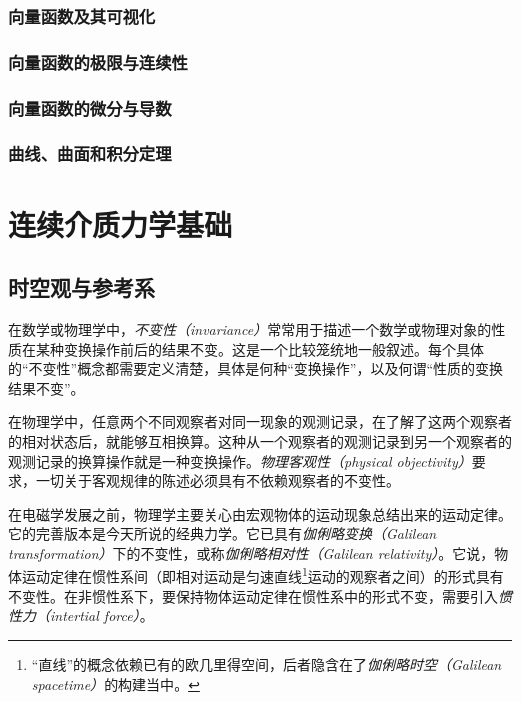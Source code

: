 \documentclass[zihao=-4,linespread=1.5,a4paper,heading=true,twoside]{ctexbook}
\theoremstyle{definition}
\theoremstyle{plain}
\begin{document}
\section{向量函数及其可视化}\label{sec:II.4.1}


\section{向量函数的极限与连续性}\label{sec:II.4.2}


\section{向量函数的微分与导数}\label{sec:II.4.3}


\section{曲线、曲面和积分定理}\label{sec:II.4.4}


\part{连续介质力学基础}\label{sec:III}
\chapter{时空观与参考系}\label{sec:III.5}
在数学或物理学中，\emph{不变性（invariance）}常常用于描述一个数学或物理对象的性质在某种变换操作前后的结果不变。这是一个比较笼统地一般叙述。每个具体的“不变性”概念都需要定义清楚，具体是何种“变换操作”，以及何谓“性质的变换结果不变”。

在物理学中，任意两个不同观察者对同一现象的观测记录，在了解了这两个观察者的相对状态后，就能够互相换算。这种从一个观察者的观测记录到另一个观察者的观测记录的换算操作就是一种变换操作。\emph{物理客观性（physical objectivity）}要求，一切关于客观规律的陈述必须具有不依赖观察者的不变性。

在电磁学发展之前，物理学主要关心由宏观物体的运动现象总结出来的运动定律。它的完善版本是今天所说的经典力学。它已具有\emph{伽俐略变换（Galilean transformation）}下的不变性，或称\emph{伽俐略相对性（Galilean relativity）}。它说，物体运动定律在惯性系间（即相对运动是匀速直线\footnote{“直线”的概念依赖已有的欧几里得空间，后者隐含在了\emph{伽俐略时空（Galilean spacetime）}的构建当中\cite{Weatherall2022}。}运动的观察者之间）的形式具有不变性。在非惯性系下，要保持物体运动定律在惯性系中的形式不变，需要引入\emph{惯性力（intertial force）}。
\end{document}
